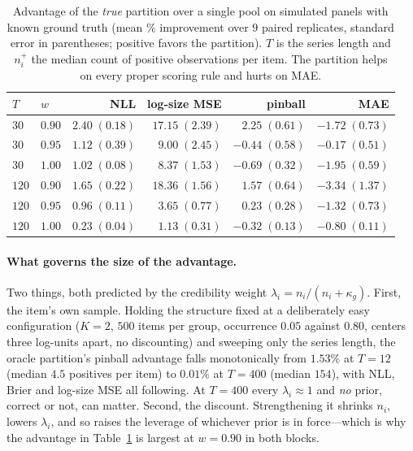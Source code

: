 \documentclass[twocolumn,10pt]{article}
\begin{document}
\begin{table}[t]
\centering
\caption{Advantage of the \emph{true} partition over a single pool on
simulated panels with known ground truth (mean \% improvement over $9$
paired replicates, standard error in parentheses; positive favors the
partition). $T$ is the series length and $n_i^{+}$ the median count of
positive observations per item. The partition helps on every proper
scoring rule and hurts on MAE.}
\label{tab:sanity}
\begin{tabular}{llrrrr}
\toprule
$T$ & $w$ & NLL & log-size MSE & pinball & MAE\\
\midrule
$30$ & $0.90$ & $2.40\;(0.18)$ & $17.15\;(2.39)$ & $2.25\;(0.61)$ & $-1.72\;(0.73)$\\
$30$ & $0.95$ & $1.12\;(0.39)$ & $9.00\;(2.45)$ & $-0.44\;(0.58)$ & $-0.17\;(0.51)$\\
$30$ & $1.00$ & $1.02\;(0.08)$ & $8.37\;(1.53)$ & $-0.69\;(0.32)$ & $-1.95\;(0.59)$\\
$120$ & $0.90$ & $1.65\;(0.22)$ & $18.36\;(1.56)$ & $1.57\;(0.64)$ & $-3.34\;(1.37)$\\
$120$ & $0.95$ & $0.96\;(0.11)$ & $3.65\;(0.77)$ & $0.23\;(0.28)$ & $-1.32\;(0.73)$\\
$120$ & $1.00$ & $0.23\;(0.04)$ & $1.13\;(0.31)$ & $-0.32\;(0.13)$ & $-0.80\;(0.11)$\\
\bottomrule
\end{tabular}
\end{table}

\paragraph{What governs the size of the advantage.} Two things, both
predicted by the credibility weight $\lambda_i=n_i/(n_i+\kappa_g)$.
First, the item's own sample. Holding the structure fixed at a
deliberately easy configuration ($K{=}2$, $500$ items per group,
occurrence $0.05$ against $0.80$, centers three log-units apart, no
discounting) and sweeping only the series length, the oracle partition's
pinball advantage falls monotonically from $1.53\%$ at $T{=}12$ (median
$4.5$ positives per item) to $0.01\%$ at $T{=}400$ (median $154$), with
NLL, Brier and log-size MSE all following. At $T{=}400$ every
$\lambda_i\approx1$ and \emph{no} prior, correct or not, can matter.
Second, the discount. Strengthening it shrinks $n_i$, lowers
$\lambda_i$, and so raises the leverage of whichever prior is in
force---which is why the advantage in Table~\ref{tab:sanity} is largest
at $w{=}0.90$ in both blocks.
\end{document}
